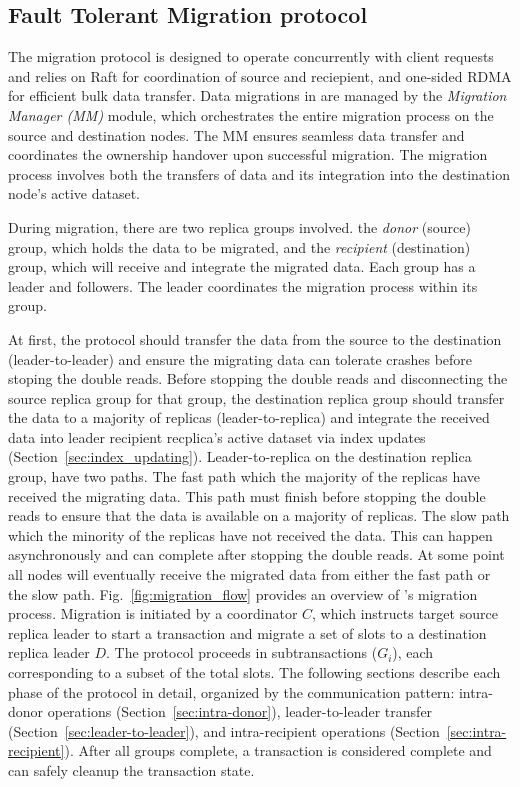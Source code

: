 \iffalse
\subsection{Fault Tolerant Migration protocol}
\label{sec:migration-protocol}

The migration protocol is designed to operate concurrently with client requests and relies on Raft for coordination of source and reciepient,
and one-sided RDMA for efficient bulk data transfer.
Data migrations in \OurImplementation{} are managed by the \emph{Migration Manager (MM)} module, which orchestrates the entire migration process on the source and destination nodes.
The MM ensures seamless data transfer and coordinates the ownership handover upon successful migration.
The migration process involves both the transfers of data and its integration into the destination node’s active dataset.

During migration, there are two replica groups involved.
the \emph{donor} (source) group, which holds the data to be migrated, and the \emph{recipient} (destination) group,
which will receive and integrate the migrated data. Each group has a leader and followers. The leader coordinates the migration process within its group.

At first, the protocol should transfer the data from the source to the destination (leader-to-leader) and ensure the migrating data can tolerate crashes before stoping the double reads.
Before stopping the double reads and disconnecting the source replica group for that group, the destination replica group should transfer the data to a majority of replicas (leader-to-replica)
and integrate the received data into leader recipient recplica’s active dataset via index updates (Section~\ref{sec:index_updating}).
Leader-to-replica on the destination replica group, have two paths. The fast path which the majority of the replicas have received the migrating data. This path must finish before stopping the double reads to ensure that the data is available on a majority of replicas.
The slow path which the minority of the replicas have not received the data. This can happen asynchronously and can complete after stopping the double reads.
At some point all nodes will eventually receive the migrated data from either the fast path or the slow path.
Fig.~\ref{fig:migration_flow} provides an overview of \OurImplementation{}’s migration process.
Migration is initiated by a coordinator $C$, which instructs target source replica leader to start a transaction and migrate a set of slots to a destination replica leader $D$.
The protocol proceeds in subtransactions ($G_i$), each corresponding to a subset of the total slots.
The following sections describe each phase of the protocol in detail, organized by the communication pattern: intra-donor operations (Section~\ref{sec:intra-donor}), leader-to-leader transfer (Section~\ref{sec:leader-to-leader}), and intra-recipient operations (Section~\ref{sec:intra-recipient}).
After all groups complete, a transaction is considered complete and can safely cleanup the transaction state.

